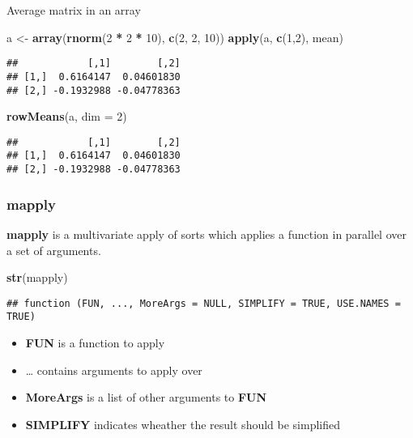 \documentclass[
]{article}
\newenvironment{Shaded}{\begin{snugshade}}{\end{snugshade}}
\newcommand{\DataTypeTok}[1]{\textcolor[rgb]{0.13,0.29,0.53}{#1}}
\newcommand{\DecValTok}[1]{\textcolor[rgb]{0.00,0.00,0.81}{#1}}
\newcommand{\KeywordTok}[1]{\textcolor[rgb]{0.13,0.29,0.53}{\textbf{#1}}}
\newcommand{\NormalTok}[1]{#1}
\newcommand{\OperatorTok}[1]{\textcolor[rgb]{0.81,0.36,0.00}{\textbf{#1}}}
\newcommand{\StringTok}[1]{\textcolor[rgb]{0.31,0.60,0.02}{#1}}
\providecommand{\tightlist}{%
  \setlength{\itemsep}{0pt}\setlength{\parskip}{0pt}}
\begin{document}
Average matrix in an array

\begin{Shaded}
\begin{Highlighting}[]
\NormalTok{a \textless{}{-}}\StringTok{ }\KeywordTok{array}\NormalTok{(}\KeywordTok{rnorm}\NormalTok{(}\DecValTok{2} \OperatorTok{*}\StringTok{ }\DecValTok{2} \OperatorTok{*}\StringTok{ }\DecValTok{10}\NormalTok{), }\KeywordTok{c}\NormalTok{(}\DecValTok{2}\NormalTok{, }\DecValTok{2}\NormalTok{, }\DecValTok{10}\NormalTok{))}
\KeywordTok{apply}\NormalTok{(a, }\KeywordTok{c}\NormalTok{(}\DecValTok{1}\NormalTok{,}\DecValTok{2}\NormalTok{), mean)}
\end{Highlighting}
\end{Shaded}

\begin{verbatim}
##            [,1]        [,2]
## [1,]  0.6164147  0.04601830
## [2,] -0.1932988 -0.04778363
\end{verbatim}

\begin{Shaded}
\begin{Highlighting}[]
\KeywordTok{rowMeans}\NormalTok{(a, }\DataTypeTok{dim =} \DecValTok{2}\NormalTok{)}
\end{Highlighting}
\end{Shaded}

\begin{verbatim}
##            [,1]        [,2]
## [1,]  0.6164147  0.04601830
## [2,] -0.1932988 -0.04778363
\end{verbatim}

\hypertarget{mapply}{%
\subsubsection{mapply}\label{mapply}}

\textbf{mapply} is a multivariate apply of sorts which applies a
function in parallel over a set of arguments.

\begin{Shaded}
\begin{Highlighting}[]
\KeywordTok{str}\NormalTok{(mapply)}
\end{Highlighting}
\end{Shaded}

\begin{verbatim}
## function (FUN, ..., MoreArgs = NULL, SIMPLIFY = TRUE, USE.NAMES = TRUE)
\end{verbatim}

\begin{itemize}
\tightlist
\item
  \textbf{FUN} is a function to apply
\item
  \ldots{} contains arguments to apply over
\item
  \textbf{MoreArgs} is a list of other arguments to \textbf{FUN}
\item
  \textbf{SIMPLIFY} indicates wheather the result should be simplified
\end{itemize}
\end{document}

